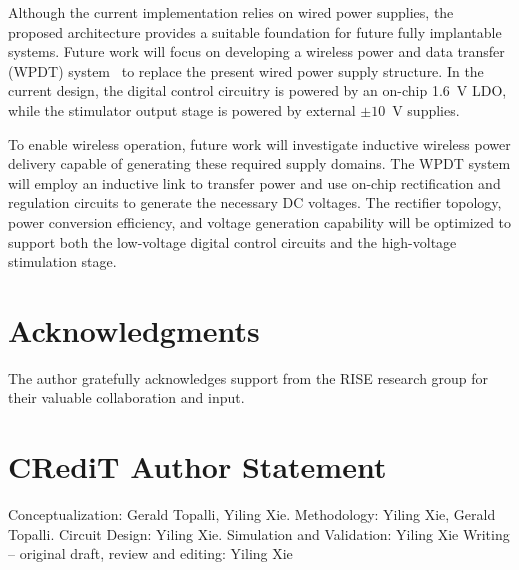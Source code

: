 \documentclass[lettersize,journal]{IEEEtran}
\begin{document}
Although the current implementation relies on wired power supplies, the proposed architecture provides a suitable foundation for future fully implantable systems. Future work will focus on developing a wireless power and data transfer (WPDT) system~\cite{ref13} to replace the present wired power supply structure. In the current design, the digital control circuitry is powered by an on-chip 1.6~V LDO, while the stimulator output stage is powered by external $\pm10$~V supplies.

To enable wireless operation, future work will investigate inductive wireless power delivery capable of generating these required supply domains. The WPDT system will employ an inductive link to transfer power and use on-chip rectification and regulation circuits to generate the necessary DC voltages. The rectifier topology, power conversion efficiency, and voltage generation capability will be optimized to support both the low-voltage digital control circuits and the high-voltage stimulation stage.


\section{Acknowledgments}
The author gratefully acknowledges support from the RISE research group for their valuable collaboration and input.
\section{CRediT Author Statement}
Conceptualization: Gerald Topalli, Yiling Xie. Methodology: Yiling Xie, Gerald Topalli. Circuit Design: Yiling Xie. Simulation and Validation: Yiling Xie  
Writing – original draft, review and editing: Yiling Xie  
\end{document}
